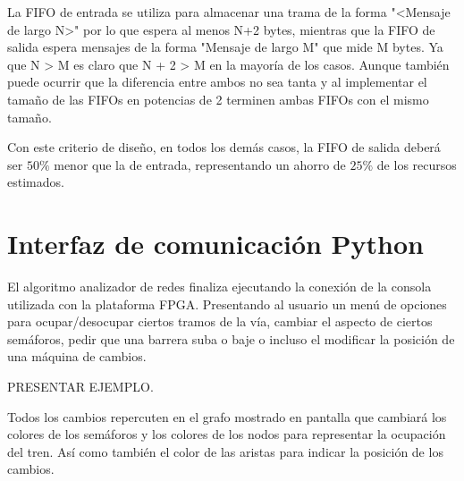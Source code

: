 		La FIFO de entrada se utiliza para almacenar una trama de la forma "<Mensaje de largo N>" por lo que espera al menos N+2 bytes, mientras que la FIFO de salida espera mensajes de la forma "Mensaje de largo M" que mide M bytes. Ya que N > M es claro que N + 2 > M en la mayoría de los casos. Aunque también puede ocurrir que la diferencia entre ambos no sea tanta y al implementar el tamaño de las FIFOs en potencias de 2 terminen ambas FIFOs con el mismo tamaño. 

		Con este criterio de diseño, en todos los demás casos, la FIFO de salida deberá ser $50\%$ menor que la de entrada, representando un ahorro de $25\%$ de los recursos estimados.

\section{Interfaz de comunicación Python}

	El algoritmo analizador de redes finaliza ejecutando la conexión de la consola utilizada con la plataforma FPGA. Presentando al usuario un menú de opciones para ocupar/desocupar ciertos tramos de la vía, cambiar el aspecto de ciertos semáforos, pedir que una barrera suba o baje o incluso el modificar la posición de una máquina de cambios.
	
	PRESENTAR EJEMPLO.
	
	Todos los cambios repercuten en el grafo mostrado en pantalla que cambiará los colores de los semáforos y los colores de los nodos para representar la ocupación del tren. Así como también el color de las aristas para indicar la posición de los cambios.
